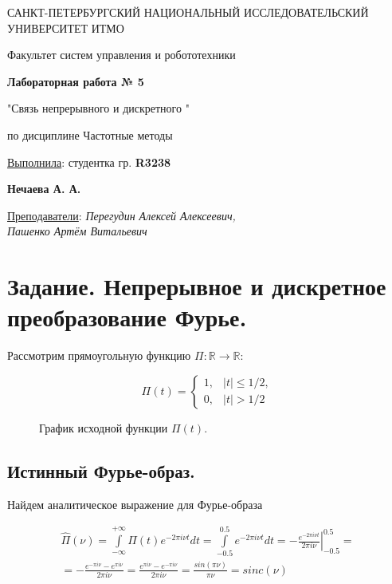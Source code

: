 \documentclass[a5paper, 10pt]{article}
\theoremstyle{definition}
\theoremstyle{plain}
\theoremstyle{remark}
\newcommand*{\titlePage}{
	\thispagestyle{title}
	\begingroup
	\begin{center}
		\vspace*{6ex}
		
		{\small
			САНКТ-ПЕТЕРБУРГСКИЙ НАЦИОНАЛЬНЫЙ ИССЛЕДОВАТЕЛЬСКИЙ УНИВЕРСИТЕТ ИТМО	
		}
		
		\vspace*{2ex}
		
		{\normalsize
			Факультет систем управления и робототехники
		}
		
		\vspace*{15ex}
		
		{\Large \bfseries 
			Лабораторная работа № 5
		}
\vspace*{2ex}
	{\Large \bfseries 
			
"Связь непрерывного и дискретного "
		}
\vspace*{2ex}
		
		{\normalsize
			по дисциплине Частотные методы
		}

	\end{center}
	\vspace*{20ex}
	\begin{flushright}
		{\large 
			\underline{Выполнила}: студентка гр. \textbf{R3238}\\
			\begin{flushright}
				\textbf{Нечаева А. А.}\\
			\end{flushright}
		}
		
		\vspace*{5ex}
		
		{\large 
			\underline{Преподаватели}: \textit{Перегудин Алексей Алексеевич,}\\ \textit{Пашенко Артём Витальевич}
		}
	\end{flushright}	
	\newpage
	\setcounter{page}{1}
	\endgroup}
\begin{document}
	\titlePage
	\pagestyle{style}
\newpage



\section{Задание. Непрерывное и дискретное преобразование Фурье.}

Рассмотрим прямоугольную функцию $\Pi : \mathbb{R} \to \mathbb{R}$:

\begin{equation}
\Pi (t) =
\begin{cases}
1, & |t| \leq 1/2,\\
0, & |t| > 1/2
\end{cases}
\end{equation}

\begin{figure}[h!]
\caption{График исходной функции $\Pi(t)$.}
\end{figure}

\newpage
\subsection{Истинный Фурье-образ.}
Найдем аналитическое выражение для Фурье-образа

\begin{multline}
\hat{\Pi}(\nu) = \int \limits_{-\infty}^{+\infty} \Pi(t) e^{-2\pi i \nu t} dt = \int \limits_{-0.5}^{0.5} e^{-2\pi i \nu t} dt =
\left. -\frac{e^{-2\pi i \nu t}}{2\pi i \nu} \right|_{-0.5}^{0.5} = \\
= -\frac{e^{-\pi i \nu} - e^{\pi i \nu}}{2\pi i \nu} = \frac{e^{\pi i \nu} - e^{-\pi i \nu}}{2\pi i \nu} = \frac{sin(\pi \nu)}{\pi \nu} = sinc(\nu)
\end{multline}
\end{document}
